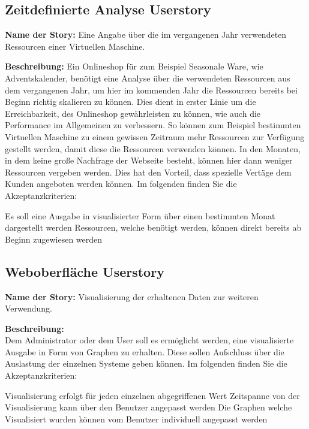 \subsection{Zeitdefinierte Analyse Userstory}
\textbf{Name der Story:} Eine Angabe über die im vergangenen Jahr verwendeten
Ressourcen einer Virtuellen Maschine.

\textbf{Beschreibung:} Ein Onlineshop für zum Beispiel Seasonale Ware, wie
Adventskalender, benötigt eine Analyse über die verwendeten Ressourcen aus dem
vergangenen Jahr, um hier im kommenden Jahr die Ressourcen bereits bei Beginn
richtig skalieren zu können. Dies dient in erster Linie um die Erreichbarkeit,
des Onlineshop gewährleisten zu können, wie auch die Performance im Allgemeinen
zu verbessern. So können zum Beispiel bestimmten Virtuellen Maschine zu einem
gewissen Zeitraum mehr Ressourcen zur Verfügung gestellt werden, damit diese
die Ressourcen verwenden können. In den Monaten, in dem keine große Nachfrage
der Webseite besteht, können hier dann weniger Ressourcen vergeben werden. Dies
hat den Vorteil, dass spezielle Vertäge dem Kunden angeboten werden können. Im
folgenden finden Sie die Akzeptanzkriterien:

\begin{outline}
  \1 Es soll eine Ausgabe in visualisierter Form über einen bestimmten Monat
  dargestellt werden
  \1 Ressourcen, welche benötigt werden, können direkt bereits ab Beginn
  zugewiesen werden
\end{outline}
\mr%

\subsection{Weboberfläche Userstory}
\textbf{Name der Story:} Visualisierung der erhaltenen Daten zur weiteren
Verwendung.

\textbf{Beschreibung:}\\ Dem Administrator oder dem User soll es ermöglicht
werden, eine visualisierte Ausgabe in Form von Graphen zu erhalten. Diese
sollen Aufschluss über die Auslastung der einzelnen Systeme geben können. Im
folgenden finden Sie die Akzeptanzkriterien:

\begin{outline}
  \1 Visualisierung erfolgt für jeden einzelnen abgegriffenen Wert
  \1 Zeitspanne von der Visualisierung kann über den Benutzer angepasst werden
  \1 Die Graphen welche Visualisiert wurden können vom Benutzer individuell
  angepasst werden
\end{outline}
\mr%

